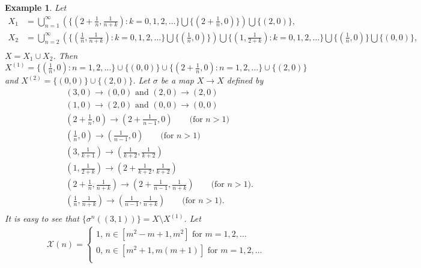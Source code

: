 \documentclass[a4paper,10pt]{amsart}
\newtheorem{example}{Example}[section]
\begin{document}
\begin{example} \label{c_exa2}
    Let
    \begin{align*}
        X_1 &= \bigcup^{\infty}_{n=1} (\{ (2+\frac{1}{n}, \frac{1}{n+k}):
        k = 0,1, 2, \ldots \} \bigcup \{(2+\frac{1}{n},0)\})
        \bigcup \{(2,0)\},\\
        X_2 &= \bigcup^{\infty}_{n=2} (\{ (\frac{1}{n}, \frac{1}{n+k}):
        k = 0,1, 2, \ldots \} \bigcup \{(\frac{1}{n},0)\}) 
        \bigcup \{ (1, \frac{1}{2+k}):
        k = 0,1, 2, \ldots \} \bigcup \{(\frac{1}{n},0)\}
        \bigcup \{(0,0)\},\\
    \end{align*}
    $X = X_1 \cup X_2$.
    Then $X^{(1)} = \{(\frac{1}{n},0): n = 1, 2, \ldots \}
    \cup \{(0,0)\} \cup \{(2+\frac{1}{n},0): n = 1, 2, \ldots \}
    \cup \{(2,0)\}$ and $X^{(2)} = \{(0,0)\} \cup \{(2,0)\}$.
    Let $\sigma$ be a map $X \rightarrow X$ defined by
    \begin{align*}
        & (3,0) \rightarrow (0,0) \mbox{ and } (2,0) \rightarrow (2,0) \\
        & (1,0) \rightarrow (2,0) \mbox{ and } (0,0) \rightarrow (0,0) \\
        & (2+\frac{1}{n}, 0) \rightarrow (2+\frac{1}{n-1}, 0) \qquad 
        \mbox{(for $n > 1$)}\\
        & (\frac{1}{n}, 0) \rightarrow (\frac{1}{n-1}, 0) \qquad 
        \mbox{(for $n > 1$)}\\
        &(3, \frac{1}{k+1}) \rightarrow (\frac{1}{k+2}, \frac{1}{k+2})\\
        &(1, \frac{1}{2+k}) \rightarrow (2+\frac{1}{k+2}, \frac{1}{k+2})\\
        &(2+\frac{1}{n}, \frac{1}{n+k}) \rightarrow  
        (2+\frac{1}{n-1}, \frac{1}{n+k}) \qquad \mbox{(for $n > 1$).} \\
        &(\frac{1}{n}, \frac{1}{n+k}) \rightarrow  
        (\frac{1}{n-1}, \frac{1}{n+k}) \qquad \mbox{(for $n > 1$).} \\
    \end{align*}
    It is easy to see that $\{ \sigma^{n}((3,1)) \} = X \setminus X^{(1)}$.
    Let
    \begin{align*}
        \mathcal{X}(n) =  
        \begin{cases}
            1  \mbox{, $n \in [m^2 -m +1, m^{2}]$ for $m = 1, 2, \ldots$}\\
            0  \mbox{, $n \in [m^2 + 1 , m(m+1)]$ for $m = 1, 2, \ldots$}\\
         \end{cases} 
    \end{align*}
\end{example}
\end{document}

